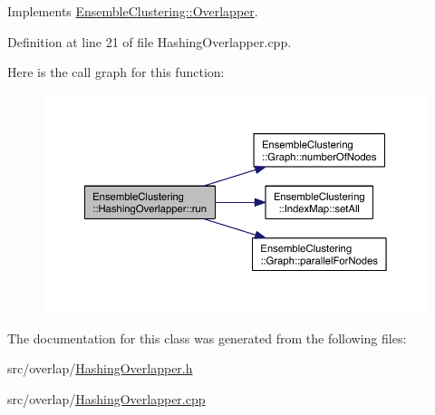 Implements \hyperlink{class_ensemble_clustering_1_1_overlapper_a427ef1bf113f2c59e26e3e3f7c3d266b}{Ensemble\-Clustering\-::\-Overlapper}.



Definition at line 21 of file Hashing\-Overlapper.\-cpp.



Here is the call graph for this function\-:
\nopagebreak
\begin{figure}[H]
\begin{center}
\leavevmode
\includegraphics[width=350pt]{class_ensemble_clustering_1_1_hashing_overlapper_afa5bd4826c328e8637c57c27e334ae0b_cgraph}
\end{center}
\end{figure}




The documentation for this class was generated from the following files\-:\begin{DoxyCompactItemize}
\item 
src/overlap/\hyperlink{_hashing_overlapper_8h}{Hashing\-Overlapper.\-h}\item 
src/overlap/\hyperlink{_hashing_overlapper_8cpp}{Hashing\-Overlapper.\-cpp}\end{DoxyCompactItemize}
